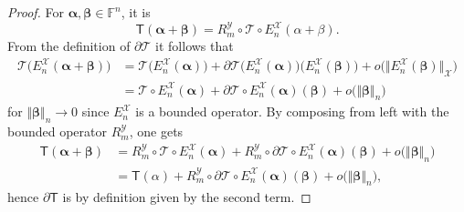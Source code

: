 \documentclass[a4paper]{paper}
\newcommand{\VecSpace}[1]{\mathscr{#1}}
\newcommand{\Field}{\mathbb{F}}
\newcommand{\Op}[1]{\mathcal{#1}}
\newcommand{\DiscOp}[1]{\mathsf{#1}}
\newcommand*{\EXT}[2]{\ensuremath{E_{#1}^{#2}}}
\newcommand*{\REST}[2]{\ensuremath{R_{#1}^{#2}}}
\newcommand*{\RmY}{\ensuremath{\REST{m}{\VecSpace{Y}}}}
\newcommand*{\EnX}{\ensuremath{\EXT{n}{\VecSpace{X}}}}
\newcommand{\valpha}{\boldsymbol{\alpha}}
\newcommand{\vbeta}{\boldsymbol{\beta}}
\begin{document}
\begin{proof}
 For $\valpha,\vbeta \in \Field^n$, it is
 \begin{equation*}
  \DiscOp{T}(\valpha + \vbeta) = \RmY \circ \Op{T} \circ \EnX (\alpha + \beta).
 \end{equation*}
 From the definition of $\partial \Op{T}$ it follows that
 \begin{align*}
  \Op{T}\big(\EnX(\valpha + \vbeta)\big)
  &= \Op{T}\big(\EnX(\valpha)\big) + \partial\Op{T}\big(\EnX(\valpha)\big)\big(\EnX(\vbeta)\big) +
  o\big(\big\Vert \EnX(\vbeta) \big\Vert_{\VecSpace{X}}\big) \\
  &= \Op{T} \circ \EnX(\valpha) + \partial\Op{T}\circ \EnX(\valpha)(\vbeta) + o\big(\Vert \vbeta \Vert_n
  \big)
 \end{align*}
 for $\Vert \vbeta \Vert_n \to 0$ since $\EnX$ is a bounded operator. By composing from left with the bounded operator $\RmY$, one gets
 \begin{align*}
  \DiscOp{T}(\valpha + \vbeta)
  &= \RmY \circ \Op{T} \circ \EnX(\valpha) + \RmY \circ \partial\Op{T}\circ \EnX(\valpha)(\vbeta) + o\big(\Vert \vbeta \Vert_n \big) \\
  &= \DiscOp{T}(\alpha) + \RmY \circ \partial\Op{T}\circ \EnX(\valpha)(\vbeta) + o\big(\Vert \vbeta \Vert_n \big),
 \end{align*}
 hence $\partial\DiscOp{T}$ is by definition given by the second term.
\end{proof}
\end{document}

